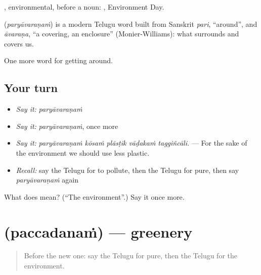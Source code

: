 , environmental, before a noun:  , Environment Day.

\begin{cousinweb}
\textbf{} (\emph{paryāvaraṇaṁ}) is a modern Telugu word built from Sanskrit \emph{pari}, \textquotedblleft{}around\textquotedblright{}, and \emph{āvaraṇa}, \textquotedblleft{}a covering, an enclosure\textquotedblright{} (Monier-Williams): what surrounds and covers us.
\end{cousinweb}

\begin{grammarlens}[title={What you've built}]
One more word for getting around.
\end{grammarlens}

\subsection*{Your turn}
\begin{itemize}
\raggedright
  \item \emph{Say it:} \emph{paryāvaraṇaṁ}
  \item \emph{Say it:} \emph{paryāvaraṇaṁ}, once more
  \item \emph{Say it:} \emph{paryāvaraṇaṁ kōsaṁ plāsṭik vāḍakaṁ taggiñcāli.} — For the sake of the environment we should use less plastic.
  \item \emph{Recall:} say the Telugu for to pollute, then the Telugu for pure, then say \emph{paryāvaraṇaṁ} again
\end{itemize}

\begin{tcolorbox}[breakable,colback=teal!4,colframe=teal!35!black,title={Before you move on}]
What does  mean? (\textquotedblleft{}The environment\textquotedblright{}.) Say it once more.
\end{tcolorbox}
\section[\texorpdfstring{\te{పచ్చదనం} (paccadanaṁ)}{పచ్చదనం (paccadanaṁ)}]{ (paccadanaṁ) — greenery}

\label{lesson:TE-C471-paccadanam}



\begin{quote}
Before the new one: say the Telugu for pure, then the Telugu for the environment.
\end{quote}

